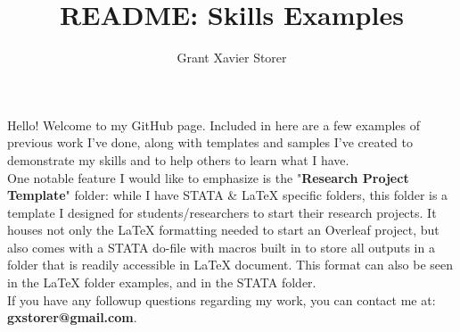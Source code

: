 \documentclass{article}
\title{README: Skills Examples}
\author{Grant Xavier Storer}
\date{}
\begin{document}
\maketitle

\noindent Hello! Welcome to my GitHub page. Included in here are a few examples of previous work I've done, along with templates and samples I've created to demonstrate my skills and to help others to learn what I have. \\

\noindent One notable feature I would like to emphasize is the "\textbf{Research Project Template}" folder: while I have STATA \& LaTeX specific folders, this folder is a template I designed for students/researchers to start their research projects. It houses not only the LaTeX formatting needed to start an Overleaf project, but also comes with a STATA do-file with macros built in to store all outputs in a folder that is readily accessible in LaTeX document. This format can also be seen in the LaTeX folder examples, and in the STATA folder.\\

\noindent If you have any followup questions regarding my work, you can contact me at: \textbf{gxstorer@gmail.com}.
\end{document}
